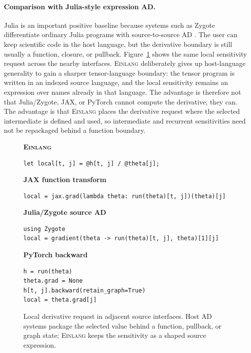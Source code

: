 \documentclass[sigplan,screen,nonacm]{acmart}
\newcommand{\einlang}{\textsc{Einlang}}
\begin{document}
\paragraph{Comparison with Julia-style expression AD.}
Julia is an important positive baseline because systems such as Zygote differentiate ordinary Julia programs with source-to-source AD \cite{julia2017,zygote2019}. The user can keep scientific code in the host language, but the derivative boundary is still usually a function, closure, or pullback. Figure~\ref{fig:ad-code-comparison} shows the same local sensitivity request across the nearby interfaces. \einlang{} deliberately gives up host-language generality to gain a sharper tensor-language boundary: the tensor program is written in an indexed source language, and the local sensitivity remains an expression over names already in that language. The advantage is therefore not that Julia/Zygote, JAX, or PyTorch cannot compute the derivative; they can. The advantage is that \einlang{} places the derivative request where the selected intermediate is defined and used, so intermediate and recurrent sensitivities need not be repackaged behind a function boundary.

\begin{figure}[t]
\centering
\begin{minipage}[t]{0.98\linewidth}
\textbf{\einlang{}}
\begin{lstlisting}[style=einlang]
let local[t, j] = @h[t, j] / @theta[j];
\end{lstlisting}
\end{minipage}

\vspace{0.25\baselineskip}
\begin{minipage}[t]{0.98\linewidth}
\textbf{JAX function transform}
\begin{lstlisting}[style=pythoncode]
local = jax.grad(lambda theta: run(theta)[t, j])(theta)[j]
\end{lstlisting}
\end{minipage}

\vspace{0.25\baselineskip}
\begin{minipage}[t]{0.98\linewidth}
\textbf{Julia/Zygote source AD}
\begin{lstlisting}[style=pythoncode]
using Zygote
local = gradient(theta -> run(theta)[t, j], theta)[1][j]
\end{lstlisting}
\end{minipage}

\vspace{0.25\baselineskip}
\begin{minipage}[t]{0.98\linewidth}
\textbf{PyTorch backward}
\begin{lstlisting}[style=pythoncode]
h = run(theta)
theta.grad = None
h[t, j].backward(retain_graph=True)
local = theta.grad[j]
\end{lstlisting}
\end{minipage}
\caption{Local derivative request in adjacent source interfaces. Host AD systems package the selected value behind a function, pullback, or graph state; \einlang{} keeps the sensitivity as a shaped source expression.}
\label{fig:ad-code-comparison}
\end{figure}
\end{document}
